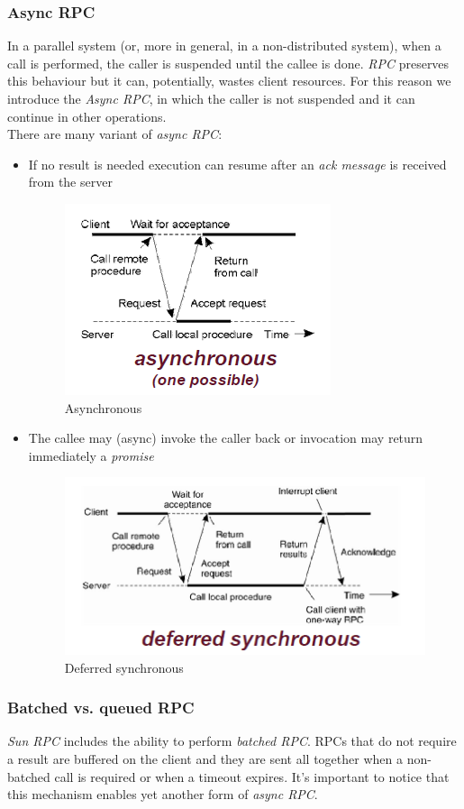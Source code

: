 \subsubsection{Async RPC}
In a parallel system (or, more in general, in a non-distributed system), when a call is performed, the caller is suspended until the callee is done. \textit{RPC} preserves this behaviour but it can, potentially, wastes client resources.
For this reason we introduce the \textit{Async RPC}, in which the caller is not suspended and it can continue in other operations.\\
There are many variant of \textit{async RPC}:
\begin{itemize}
    \item If no result is needed execution can resume after an \textit{ack message} is received from the server
    \begin{figure}[h]
        \caption{Asynchronous}
        \includegraphics[scale=0.6]{src/images/async.png}
        \centering
    \end{figure}

    \item The callee may (async) invoke the caller back or invocation may return immediately a \textit{promise}
    \begin{figure}[h]
        \caption{Deferred synchronous}
        \includegraphics[scale=0.6]{src/images/deferred-synchronous.png}
        \centering
    \end{figure}
\end{itemize}

\subsubsection{Batched vs. queued RPC}
\textit{Sun RPC} includes the ability to perform \textit{batched RPC}. RPCs that do not require a result are buffered on the client and they are sent all together when a non-batched call is required or when a timeout expires. It's important to notice that this mechanism enables yet another form of \textit{async RPC}.
